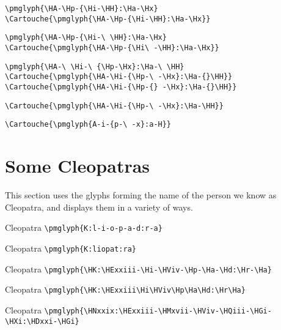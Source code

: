 \documentclass{article}
\begin{document}
\verb|\pmglyph{\HA-\Hp-{\Hi-\HH}:\Ha-\Hx}| \\
\verb|\Cartouche{\pmglyph{\HA-\Hp-{\Hi-\HH}:\Ha-\Hx}}| \\
\pmglyph{\HA-\Hp-{\Hi-\HH}:\Ha-\Hx}
\Cartouche{\pmglyph{\HA-\Hp-{\Hi-\HH}:\Ha-\Hx}}

\verb|\pmglyph{\HA-\Hp-{\Hi-\ \HH}:\Ha-\Hx}| \\
\verb|\Cartouche{\pmglyph{\HA-\Hp-{\Hi\ -\HH}:\Ha-\Hx}}| \\
\pmglyph{\HA-\Hp-{\Hi-\ \HH}:\Ha-\Hx}
\Cartouche{\pmglyph{\HA-\Hp-{\Hi\ -\HH}:\Ha-\Hx}}

\verb|\pmglyph{\HA-\ \Hi-\ {\Hp-\Hx}:\Ha-\ \HH}| \\
\verb|\Cartouche{\pmglyph{\HA-\Hi-{\Hp-\ -\Hx}:\Ha-{}\HH}}| \\
\verb|\Cartouche{\pmglyph{\HA-\Hi-{\Hp-{} -\Hx}:\Ha-{}\HH}}| \\
\pmglyph{\HA-\ \Hi-\ {\Hp-\Hx}:\Ha-\ \HH}
\Cartouche{\pmglyph{\HA-\Hi-{\Hp-\ -\Hx}:\Ha-{}\HH}}
\Cartouche{\pmglyph{\HA-\Hi-{\Hp-{} -\Hx}:\Ha-{}\HH}}

\verb|\Cartouche{\pmglyph{\HA-\Hi-{\Hp-\ -\Hx}:\Ha-\HH}}| 
      \Cartouche{\pmglyph{\HA-\Hi-{\Hp-\ -\Hx}:\Ha-\HH}} 

\verb|\Cartouche{\pmglyph{A-i-{p-\ -x}:a-H}}| 

\section{Some Cleopatras}

    This section uses the glyphs forming the name of the person we know
as Cleopatra, and displays them in a variety of ways.

Cleopatra \verb|\pmglyph{K:l-i-o-p-a-d:r-a}| 

Cleopatra \verb|\pmglyph{K:liopat:ra}| 

Cleopatra \verb|\pmglyph{\HK:\HExxiii-\Hi-\HViv-\Hp-\Ha-\Hd:\Hr-\Ha}| 
                \pmglyph{\HK:\HExxiii-\Hi-\HViv-\Hp-\Ha-\Hd:\Hr-\Ha} 

Cleopatra \verb|\pmglyph{\HK:\HExxiii\Hi\HViv\Hp\Ha\Hd:\Hr\Ha}| 
                \pmglyph{\HK:\HExxiii\Hi\HViv\Hp\Ha\Hd:\Hr\Ha} 

Cleopatra \verb|\pmglyph{\HNxxix:\HExxiii-\HMxvii-\HViv-\HQiii-\HGi-\HXi:\HDxxi-\HGi}| 
                \pmglyph{\HNxxix:\HExxiii-\HMxvii-\HViv-\HQiii-\HGi-\HXi:\HDxxi-\HGi} 
\end{document}
